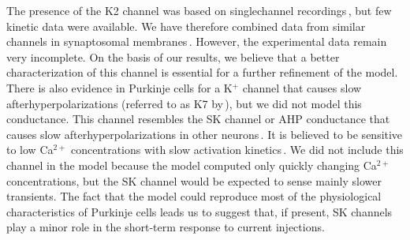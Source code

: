 \documentclass[12pt]{article}
\begin{document}
The presence of the K2 channel was based on singlechannel
recordings\,\cite{Gruol:1991dz}, but few kinetic data
were available. We have therefore combined data from similar
channels in synaptosomal membranes\,\cite{Farley:1988tw, Reinhart1989:xe}. 
However, the experimental
data remain very incomplete. On the basis of our results,
we believe that a better characterization of this channel is
essential for a further refinement of the model.
There is also evidence in Purkinje cells for a K$^+$ channel
that causes slow afterhyperpolarizations (referred to as K7
by\,\cite{Gruol:1991dz}), but we did not model this conductance.
This channel resembles the SK channel or AHP conductance
that causes slow afterhyperpolarizations in other
neurons\,\cite{Lancaster:1991ye, Latorre:1989fu}. It is
believed to be sensitive to low Ca$^{2+}$ concentrations with
slow activation kinetics\,\cite{Pennefeather:1990kl}. We did
not include this channel in the model because the model
computed only quickly changing Ca$^{2+}$ concentrations, but
the SK channel would be expected to sense mainly slower
transients. The fact that the model could reproduce most of
the physiological characteristics of Purkinje cells leads us to
suggest that, if present, SK channels play a minor role in the
short-term response to current injections.



\end{document}
